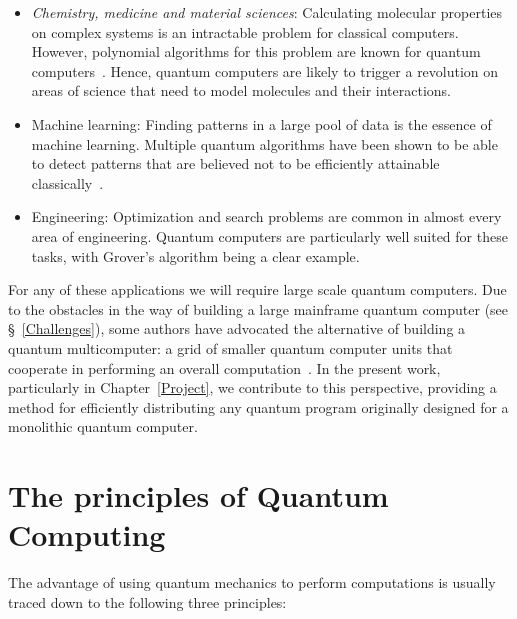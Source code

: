 \begin{itemize}
  \item \textit{Chemistry, medicine and material sciences}: Calculating molecular properties on complex systems is an intractable problem for classical computers. However, polynomial algorithms for this problem are known for quantum computers~\citep{TowardsQuantumChemistry}. Hence, quantum computers are likely to trigger a revolution on areas of science that need to model molecules and their interactions.
  \item Machine learning: Finding patterns in a large pool of data is the essence of machine learning. Multiple quantum algorithms have been shown to be able to detect patterns that are believed not to be efficiently attainable classically~\citep{QuantumMachineLearning}.
  \item Engineering: Optimization and search problems are common in almost every area of engineering. Quantum computers are particularly well suited for these tasks, with Grover's algorithm being a clear example.
\end{itemize}

For any of these applications we will require large scale quantum computers. Due to the obstacles in the way of building a large mainframe quantum computer (see \S~\ref{Challenges}), some authors have advocated the alternative of building a quantum multicomputer: a grid of smaller quantum computer units that cooperate in performing an overall computation~\citep{DistributedQCHW}. In the present work, particularly in Chapter~\ref{Project}, we contribute to this perspective, providing a method for efficiently distributing any quantum program originally designed for a monolithic quantum computer.

\section{The principles of Quantum Computing}
\label{Principles}

The advantage of using quantum mechanics to perform computations is usually traced down to the following three principles:

